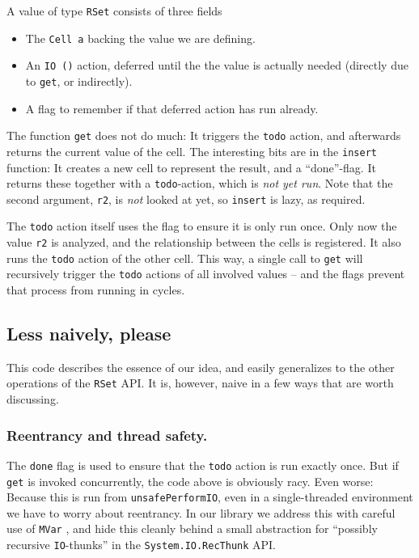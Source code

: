\documentclass[manuscript,anonymous,screen,acmsmall]{acmart}
\begin{document}
A value of type \verb|RSet| consists of three fields
\begin{itemize}
\item The \verb|Cell a| backing the value we are defining.
\item An \verb|IO ()| action, deferred until the the value is actually needed (directly due to \verb|get|, or indirectly).
\item A flag to remember if that deferred action has run already.
\end{itemize}

The function \verb|get| does not do much: It triggers the \verb|todo| action, and afterwards returns the current value of the cell. The interesting bits are in the \verb|insert| function: It creates a new cell to represent the result, and a “done”-flag. It returns these together with a \verb|todo|-action, which is \emph{not yet run}. Note that the second argument, \verb|r2|, is \emph{not} looked at yet, so \verb|insert| is lazy, as required.

The \verb|todo| action itself uses the flag to ensure it is only run once. Only now the value \verb|r2| is analyzed, and the relationship between the cells is registered. It also runs the \verb|todo| action of the other cell. This way, a single call to \verb|get| will recursively trigger the \verb|todo| actions of all involved values -- and the flags prevent that process from running in cycles.

\subsection{Less naively, please}

This code describes the essence of our idea, and easily generalizes to the other operations of the \verb|RSet| API. It is, however, naive in a few ways that are worth discussing.

\subsubsection{Reentrancy and thread safety.}\label{sec:thread}

The \verb|done| flag is used to ensure that the \verb|todo| action is run exactly once. But if \verb|get| is invoked concurrently, the code above is obviously racy. Even worse: Because this is run from \verb|unsafePerformIO|, even in a single-threaded environment we have to worry about reentrancy. In our library we address this with careful use of \verb|MVar| \cite{concurrent}, and hide this cleanly behind a small abstraction for “possibly recursive \verb|IO|-thunks” in the \verb|System.IO.RecThunk| API.
\end{document}
